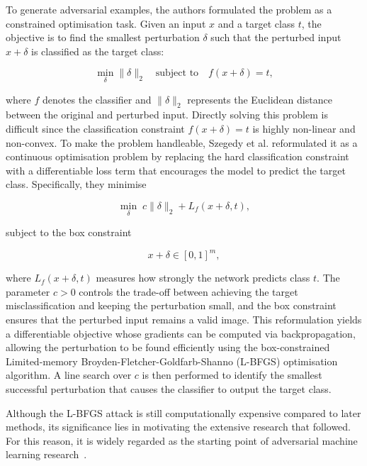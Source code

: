 \documentclass[review]{AIM_report}
\begin{document}
To generate adversarial examples, the authors formulated the problem as a constrained optimisation task. Given an input $x$ and a target class $t$, the objective is to find the smallest perturbation $\delta$ such that the perturbed input $x+\delta$ is classified as the target class:

\begin{equation}
\min_\delta \|\delta\|_2
\quad \text{subject to} \quad
f(x+\delta)=t,
\end{equation}

where $f$ denotes the classifier and $\|\delta\|_2$ represents the Euclidean distance between the original and perturbed input. 
Directly solving this problem is difficult since the classification constraint $f(x+\delta)=t$ is highly non-linear and non-convex. To make the problem handleable, Szegedy et al. reformulated it as a continuous optimisation problem by replacing the hard classification constraint with a differentiable loss term that encourages the model to predict the target class. Specifically, they minimise

\begin{equation}
\min_\delta \; c\|\delta\|_2 + L_f(x+\delta,t),
\end{equation}

subject to the box constraint

\begin{equation}
x+\delta \in [0,1]^m,
\end{equation}

where $L_f(x+\delta,t)$ measures how strongly the network predicts class $t$. The parameter $c>0$ controls the trade-off between achieving the target misclassification and keeping the perturbation small, and the box constraint ensures that the perturbed input remains a valid image. This reformulation yields a differentiable objective whose gradients can be computed via backpropagation, allowing the perturbation to be found efficiently using the box-constrained Limited-memory Broyden-Fletcher-Goldfarb-Shanno (L-BFGS) optimisation algorithm. A line search over $c$ is then performed to identify the smallest successful perturbation that causes the classifier to output the target class.

Although the L-BFGS attack is still computationally expensive compared to later methods, its significance lies in motivating the extensive research that followed. For this reason, it is widely regarded as the starting point of adversarial machine learning research~\cite{goodfellow2014explaining, costa2024deep, liang2022adversarial}.
\end{document}
